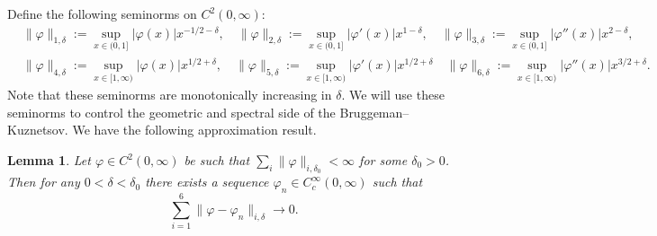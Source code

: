 \documentclass{article}
\newtheorem{lem}[thm]{Lemma}
\theoremstyle{named}
\begin{document}
Define the following seminorms on $C^2(0, \infty)$:
\begin{equation*}
\begin{aligned}
    & \|\varphi\|_{1, \delta} := \sup_{x \in (0, 1]} |\varphi(x)|x^{-1/2 - \delta},\quad  \|\varphi\|_{2, \delta} := \sup_{x \in (0, 1]} |\varphi'(x)|x^{1 - \delta}, \quad \|\varphi\|_{3, \delta} := \sup_{x \in (0, 1]} |\varphi''(x)|x^{2 - \delta},\\
    & \|\varphi\|_{4, \delta} := \sup_{x \in [1, \infty)} |\varphi(x)| x^{1/2 + \delta}, \quad \|\varphi\|_{5, \delta} := \sup_{x \in [1, \infty)} |\varphi'(x)|x^{1/2 + \delta} \quad \|\varphi\|_{6, \delta} := \sup_{x \in [1, \infty)}|\varphi''(x)|x^{3/2 + \delta}.
\end{aligned}
\end{equation*} 
Note that these seminorms are monotonically increasing in $\delta$. We will use these seminorms to control the geometric and spectral side of the Bruggeman--Kuznetsov. We have the following approximation result.

\begin{lem}\label{lem:approximationc2function}
Let $\varphi \in C^2(0, \infty)$ be such that $\sum_i \|\varphi\|_{i, \delta_0} < \infty$ for some $\delta_0 > 0$. Then for any $0 < \delta < \delta_0$ there exists a sequence $\varphi_n \in C_c^\infty(0, \infty)$ such that 
\begin{equation*}
    \sum_{i = 1}^6 \|\varphi- \varphi_n\|_{i, \delta} \to 0.    
\end{equation*}
\end{lem}
\end{document}
